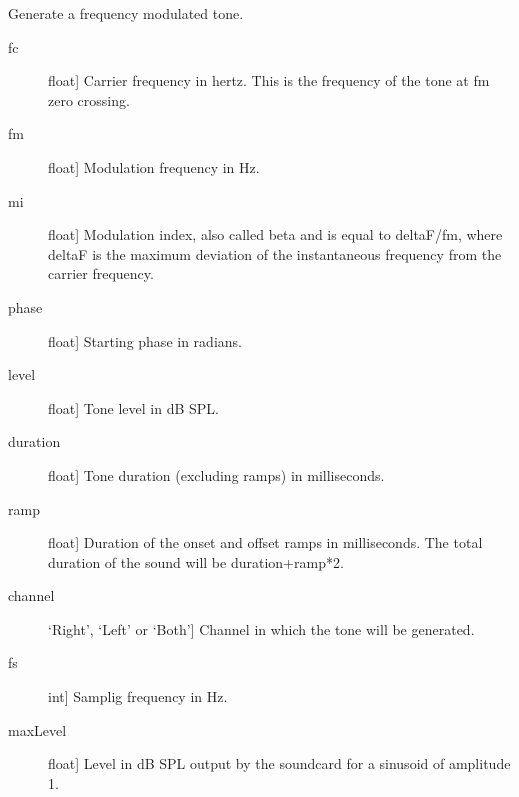 \documentclass[letterpaper,10pt,english]{sphinxmanual}
\begin{document}

\begin{fulllineitems}
\label{index:sndlib.ERBDistance}
\end{fulllineitems}


\begin{fulllineitems}
\label{index:sndlib.FMTone}
Generate a frequency modulated tone.
\begin{description}
\item[{fc}] \leavevmode{[}float{]}
Carrier frequency in hertz. This is the frequency of the tone at fm zero crossing.

\item[{fm}] \leavevmode{[}float{]}
Modulation frequency in Hz.

\item[{mi}] \leavevmode{[}float{]}
Modulation index, also called beta and is equal to deltaF/fm, where
deltaF is the maximum deviation of the instantaneous frequency from
the carrier frequency.

\item[{phase}] \leavevmode{[}float{]}
Starting phase in radians.

\item[{level}] \leavevmode{[}float{]}
Tone level in dB SPL.

\item[{duration}] \leavevmode{[}float{]}
Tone duration (excluding ramps) in milliseconds.

\item[{ramp}] \leavevmode{[}float{]}
Duration of the onset and offset ramps in milliseconds.
The total duration of the sound will be duration+ramp*2.

\item[{channel}] \leavevmode{[}`Right', `Left' or `Both'{]}
Channel in which the tone will be generated.

\item[{fs}] \leavevmode{[}int{]}
Samplig frequency in Hz.

\item[{maxLevel}] \leavevmode{[}float{]}
Level in dB SPL output by the soundcard for a sinusoid of
amplitude 1.


\end{description}
\end{fulllineitems}
\end{document}
